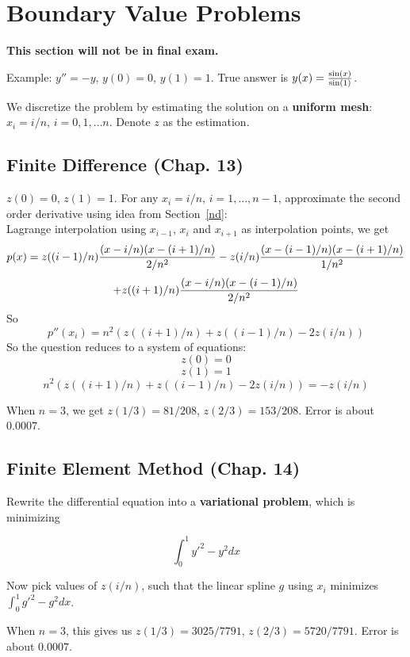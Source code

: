 \documentclass[20pt]{article} %
\theoremstyle{break}
\begin{document}
\newpage

\section{Boundary Value Problems}

{\bf This section will not be in final exam.}

Example: $y''=-y$, $y(0)=0$, $y(1)=1$. True answer is $y(x)={\sin(x)\over\sin(1)}$.

We discretize the problem by estimating the solution on a {\bf uniform mesh}: $x_i=i/n$, $i=0, 1, \dots n$. Denote $z$ as the estimation.

\subsection{Finite Difference (Chap. 13)}

$z(0)=0$, $z(1)=1$. For any $x_i=i/n$, $i=1, \dots, n-1$, approximate the second order derivative using idea from Section~\ref{nd}:\\

Lagrange interpolation using $x_{i-1}$, $x_i$ and $x_{i+1}$ as interpolation points, we get
  \[p(x)=z((i-1)/n){(x-i/n)(x-(i+1)/n)\over 2/n^2}-z(i/n){(x-(i-1)/n)(x-(i+1)/n)\over 1/n^2}\]
  \[+z((i+1)/n){(x-i/n)(x-(i-1)/n)\over 2/n^2}\]
  So
  \[p''(x_i)=n^2(z((i+1)/n)+z((i-1)/n)-2z(i/n))\]
  So the question reduces to a system of equations:
  \[z(0)=0\]
  \[z(1)=1\]
  \[n^2(z((i+1)/n)+z((i-1)/n)-2z(i/n))=-z(i/n)\]

  When $n=3$, we get $z(1/3)=81/208$, $z(2/3)=153/208$. Error is about $0.0007$.

  \newpage
  
  \subsection{Finite Element Method (Chap. 14)}
  
Rewrite the differential equation into a {\bf variational problem}, which is minimizing
  
\[\int_0^1y'^2-y^2 dx\]

Now pick values of $z(i/n)$, such that the linear spline $g$ using $x_i$ minimizes $\int_0^1g'^2-g^2dx$.

When $n=3$, this gives us $z(1/3)=3025/7791$, $z(2/3)=5720/7791$. Error is about $0.0007$.

\newpage
\end{document}
